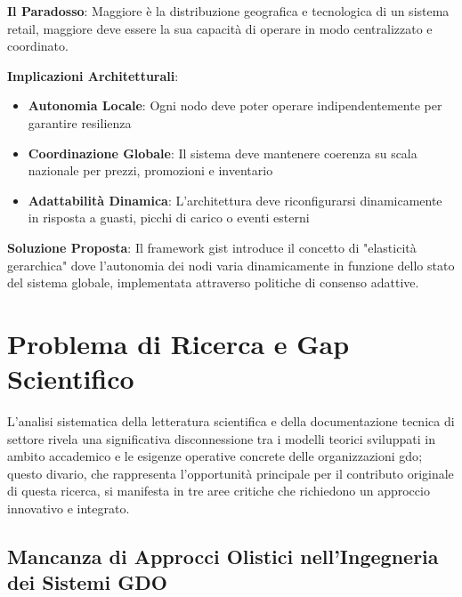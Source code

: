 \begin{tcolorbox}[
    colback=blue!5!white,
    colframe=blue!75!black,
    title={\textbf{Innovation Box 1.1:} Il Paradosso della Complessità Sistemica nella \gls{gdo}},
    fonttitle=\bfseries,
    boxrule=1.5pt,
    arc=2mm,
    breakable
]
\textbf{Il Paradosso}: Maggiore è la distribuzione geografica e tecnologica di un sistema retail, maggiore deve essere la sua capacità di operare in modo centralizzato e coordinato.

\vspace{0.3cm}
\textbf{Implicazioni Architetturali}:
\begin{itemize}
    \item \textbf{Autonomia Locale}: Ogni nodo deve poter operare indipendentemente per garantire resilienza
    \item \textbf{Coordinazione Globale}: Il sistema deve mantenere coerenza su scala nazionale per prezzi, promozioni e inventario
    \item \textbf{Adattabilità Dinamica}: L'architettura deve riconfigurarsi dinamicamente in risposta a guasti, picchi di carico o eventi esterni
\end{itemize}

\vspace{0.3cm}
\textbf{Soluzione Proposta}: Il framework \gls{gist} introduce il concetto di "elasticità gerarchica" dove l'autonomia dei nodi varia dinamicamente in funzione dello stato del sistema globale, implementata attraverso politiche di consenso adattive.
\end{tcolorbox}

\section{\texorpdfstring{\textbf{Problema di Ricerca e Gap Scientifico}}{1.2 - Problema di Ricerca e Gap Scientifico}}
\label{sec:problema_ricerca}

L'analisi sistematica della letteratura scientifica e della documentazione tecnica di settore rivela una significativa disconnessione tra i modelli teorici sviluppati in ambito accademico e le esigenze operative concrete delle organizzazioni \gls{gdo}; questo divario, che rappresenta l'opportunità principale per il contributo originale di questa ricerca, si manifesta in tre aree critiche che richiedono un approccio innovativo e integrato.

\subsection{\texorpdfstring{\textbf{Mancanza di Approcci Olistici nell'Ingegneria dei Sistemi GDO}}{1.2.1 - Mancanza di Approcci Olistici nell'Ingegneria dei Sistemi GDO}}

